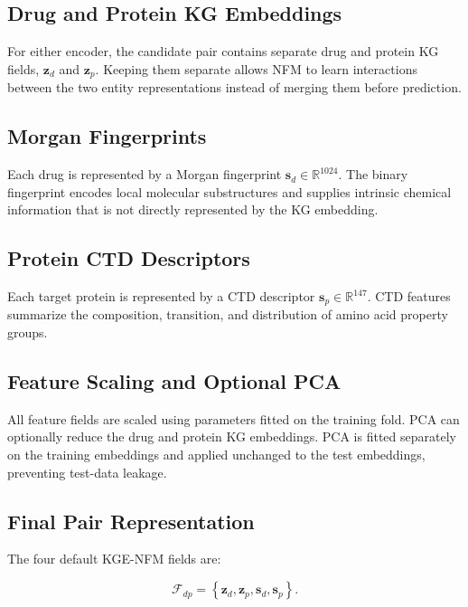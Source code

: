 \subsection{Drug and Protein KG Embeddings}

For either encoder, the candidate pair contains separate drug and protein KG
fields, $\mathbf{z}_{d}$ and $\mathbf{z}_{p}$. Keeping them separate allows
NFM to learn interactions between the two entity representations instead of
merging them before prediction.

\subsection{Morgan Fingerprints}

Each drug is represented by a Morgan fingerprint
$\mathbf{s}_{d}\in\mathbb{R}^{1024}$. The binary fingerprint encodes local
molecular substructures and supplies intrinsic chemical information that is
not directly represented by the KG embedding.

\subsection{Protein CTD Descriptors}

Each target protein is represented by a CTD descriptor
$\mathbf{s}_{p}\in\mathbb{R}^{147}$. CTD features summarize the composition,
transition, and distribution of amino acid property groups.

\subsection{Feature Scaling and Optional PCA}

All feature fields are scaled using parameters fitted on the training fold.
PCA can optionally reduce the drug and protein KG embeddings. PCA is fitted
separately on the training embeddings and applied unchanged to the test
embeddings, preventing test-data leakage.

\subsection{Final Pair Representation}

The four default KGE-NFM fields are:

\begin{equation}
    \mathcal{F}_{dp}
    =
    \left\{
        \mathbf{z}_{d},
        \mathbf{z}_{p},
        \mathbf{s}_{d},
        \mathbf{s}_{p}
    \right\}.
    \label{eq:kge_nfm_fields}
\end{equation}

